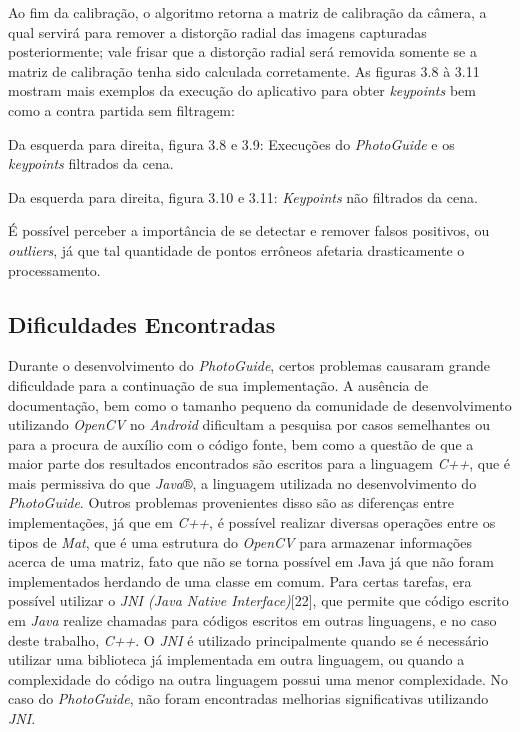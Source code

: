 Ao fim da calibração, o algoritmo retorna a matriz de calibração da câmera, a qual servirá para remover a distorção radial das imagens capturadas posteriormente; vale frisar que a distorção radial será removida somente se  a matriz de calibração tenha sido calculada corretamente. As figuras 3.8 à 3.11 mostram mais exemplos da execução do aplicativo para obter \textit{keypoints} bem como a contra partida sem filtragem:


Da esquerda para direita, figura 3.8 e 3.9: Execuções do \textit{PhotoGuide} e os \textit{keypoints} filtrados da cena.


Da esquerda para direita, figura 3.10 e 3.11: \textit{Keypoints} não filtrados da cena.

É possível perceber a importância de se detectar e remover falsos positivos, ou \textit{outliers}, já que tal quantidade de pontos errôneos afetaria drasticamente o processamento.

\subsection{Dificuldades Encontradas}

Durante o desenvolvimento do \textit{PhotoGuide}, certos problemas causaram grande dificuldade para a continuação de sua implementação. A ausência de documentação, bem como o tamanho pequeno da comunidade de desenvolvimento utilizando \textit{OpenCV} no \textit{Android} dificultam a pesquisa por casos semelhantes ou para a procura de auxílio com o código fonte, bem como a questão de que a maior parte dos resultados encontrados são escritos para a linguagem \textit{C++}, que é mais permissiva do que \textit{Java}®, a linguagem utilizada no desenvolvimento do \textit{PhotoGuide}. Outros problemas provenientes disso são as diferenças entre implementações, já que em \textit{C++}, é possível realizar diversas operações entre os tipos de \textit{Mat},  que é uma estrutura do \textit{OpenCV} para armazenar informações acerca de uma matriz, fato que não se torna possível em Java já que não foram implementados herdando de uma classe em comum. Para certas tarefas, era possível utilizar o \textit{JNI (Java Native Interface)}[22], que permite que código escrito em \textit{Java }realize chamadas para códigos escritos em outras linguagens, e no caso deste trabalho, \textit{C++}. O \textit{JNI} é utilizado principalmente quando se é necessário utilizar uma biblioteca já implementada em outra linguagem, ou quando a complexidade do código na outra linguagem possui uma menor complexidade. No caso do \textit{PhotoGuide}, não foram encontradas melhorias significativas utilizando \textit{JNI}. 


